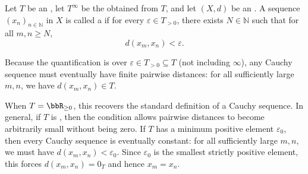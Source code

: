 \begin{definition} \label{definition:cauchy_sequence_in_an_extended_metric_space_valued_in_ordered_commutative_monoid_with_adjoined_infinity}
    Let $T$ be an , let $T^\infty$ be the  obtained from $T$, and let $(X, d)$ be an .
    A sequence $(x_n)_{n \in \mathbb{N}}$ in $X$ is called a  if for every $\varepsilon \in T_{>0}$, there exists $N \in \mathbb{N}$ such that for all $m, n \geq N$,
    $$d(x_m, x_n) < \varepsilon.$$

    Because the quantification is over $\varepsilon \in T_{>0} \subseteq T$ (not including $\infty$), any Cauchy sequence must eventually have finite pairwise distances: for all sufficiently large $m,n$, we have $d(x_m,x_n) \in T$.

    When $T = \bbR_{\geq 0}$, this recovers the standard definition of a Cauchy sequence. In general, if $T$ is , then the condition allows pairwise distances to become arbitrarily small without being zero. If $T$ has a minimum positive element $\varepsilon_0$, then every Cauchy sequence is eventually constant: for all sufficiently large $m,n$, we must have $d(x_m,x_n) < \varepsilon_0$. Since $\varepsilon_0$ is the smallest strictly positive element, this forces $d(x_m,x_n) = 0_T$ and hence $x_m = x_n$.
\end{definition}
